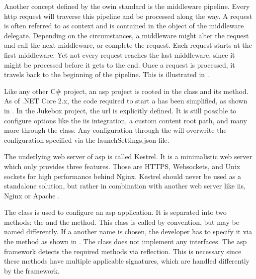 Another concept defined by the \gls{owin} standard is the middleware pipeline. Every \gls{http} request will traverse this pipeline and be processed along the way. A request is often referred to as context and is contained in the  object of the middleware delegate. Depending on the circumstances, a middleware might alter the request and call the next middleware, or complete the request. Each request starts at the first middleware. Yet not every request reaches the last middleware, since it might be processed before it gets to the end. Once a request is processed, it travels back to the beginning of the pipeline. This is illustrated in .



Like any other C\# project, an \gls{asp} project is rooted in the  class and its  method. As of .NET Core 2.x, the code required to start a  has been simplified, as shown in  \cite{aspFundamentals}. In the Jukebox project, the \gls{url} is explicitly defined. It is still possible to configure options like the \gls{iis} integration, a custom content root path, and many more through the  class. Any configuration through the  will overwrite the configuration specified via the launchSettings.json file.

The underlying web server of \gls{asp} is called Kestrel. It is a minimalistic web server which only provides three features. Those are HTTPS, Websockets, and Unix sockets for high performance behind Nginx. Kestrel should never be used as a standalone solution, but rather in combination with another web server like \gls{iis}, Nginx or Apache \cite{kestrel}.




The  class is used to configure an \gls{asp} application. It is separated into two methods: the  and the  method. This class is called  by convention, but may be named differently. If a another name is chosen, the developer has to specify it via the  method as shown in . The  class does not implement any interfaces. The \gls{asp} framework detects the required methods via reflection. This is necessary since these methods have multiple applicable signatures, which are handled differently by the framework.

